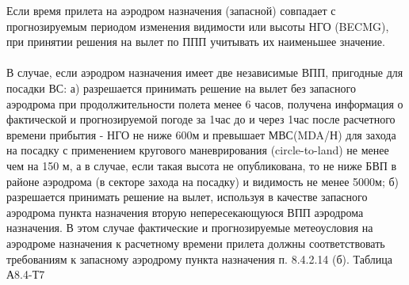 Если время прилета на аэродром назначения (запасной) совпадает с прогнозируемым периодом изменения видимости или высоты НГО (BECMG), при принятии решения на вылет по ППП учитывать их наименьшее значение.

\paragraph{} \label{par:altex}В случае, если аэродром назначения имеет две независимые ВПП, пригодные для посадки ВС: 
а)	разрешается принимать решение на вылет без запасного аэродрома при продолжительности полета менее 6 часов, получена информация о фактической и прогнозируемой погоде за 1час до и через 1час после расчетного времени прибытия - НГО не ниже 600м и превышает МВС(MDA/Н) для захода на посадку с применением кругового маневрирования (circle-to-land) не менее чем на 150 м, а в случае, если такая высота не опубликована, то не ниже БВП в районе аэродрома (в секторе захода на посадку) и видимость не менее 5000м; 
б)	разрешается принимать решение на вылет, используя в качестве запасного аэродрома пункта назначения вторую непересекающуюся ВПП аэродрома назначения. В этом случае фактические и прогнозируемые метеоусловия на аэродроме назначения к расчетному времени прилета должны соответствовать требованиям к запасному аэродрому пункта назначения п. 8.4.2.14 (б).                                                               Таблица А8.4-Т7                                                                                                                              

